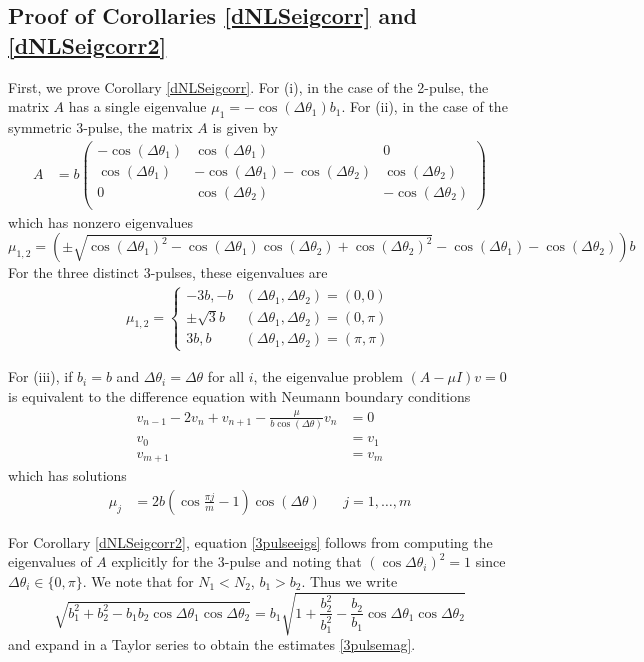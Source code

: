 \documentclass[12pt]{article}
\begin{document}
\subsection{Proof of Corollaries \ref{dNLSeigcorr} and \ref{dNLSeigcorr2}}

First, we prove Corollary \ref{dNLSeigcorr}. For (i), in the case of the 2-pulse, the matrix $A$ has a single eigenvalue $\mu_1 = -\cos(\Delta\theta_1) b_1$. For (ii), in the case of the symmetric 3-pulse, the matrix $A$ is given by
\begin{align*}
A &= b \begin{pmatrix}
-\cos(\Delta\theta_1) & \cos(\Delta\theta_1) & 0  \\
\cos(\Delta\theta_1) & -\cos(\Delta\theta_1) - \cos(\Delta\theta_2) & \cos(\Delta\theta_2) \\ 
0 & \cos(\Delta\theta_2) & -\cos(\Delta\theta_2) \\
\end{pmatrix}
\end{align*}
which has nonzero eigenvalues
\[
\mu_{1, 2} = \left( \pm\sqrt{\cos(\Delta\theta_1)^2 - \cos(\Delta\theta_1) \cos(\Delta\theta_2) + \cos(\Delta\theta_2)^2} - \cos(\Delta\theta_1) - \cos(\Delta\theta_2) \right)b
\]
For the three distinct 3-pulses, these eigenvalues are
\begin{align*}
\mu_{1, 2} = \begin{cases}
-3b, -b & (\Delta\theta_1, \Delta\theta_2) = (0, 0) \\
\pm \sqrt{3}b & (\Delta\theta_1, \Delta\theta_2) = (0, \pi) \\
3b, b & (\Delta\theta_1, \Delta\theta_2) = (\pi, \pi)
\end{cases}
\end{align*}

For (iii), if $b_i = b$ and $\Delta\theta_i = \Delta\theta$ for all $i$, the eigenvalue problem $(A - \mu I)v = 0$ is equivalent to the difference equation with Neumann boundary conditions
\begin{equation*}
\begin{aligned}
v_{n-1} - 2 v_n + v_{n+1} - \frac{\mu}{b \cos(\Delta\theta)} v_n &= 0 \\
v_0 &= v_1 \\
v_{m+1} &= v_m
\end{aligned}
\end{equation*}
which has solutions
\begin{align*}
\mu_j &= 2 b \left( \cos\frac{\pi j}{m} - 1 \right) \cos (\Delta\theta) && j = 1, \dots, m
\end{align*}

For Corollary \ref{dNLSeigcorr2}, equation \eqref{3pulseeigs} follows from computing the eigenvalues of $A$ explicitly for the 3-pulse and noting that $(\cos \Delta \theta_i)^2 = 1$ since $\Delta \theta_i \in \{0, \pi\}$. We note that for $N_1 < N_2$, $b_1 > b_2$. Thus we write
\[
\sqrt{b_1^2 + b_2^2 - b_1 b_2\cos\Delta\theta_1 \cos\Delta\theta_2} = b_1
\sqrt{1 + \frac{b_2^2}{b_1^2} - \frac{b_2}{b_1} \cos\Delta\theta_1 \cos\Delta\theta_2} 
\]
and expand in a Taylor series to obtain the estimates \eqref{3pulsemag}.



\end{document}
